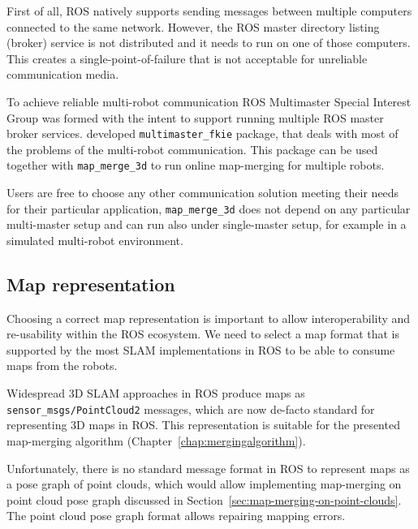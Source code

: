 First of all, \gls{ROS} natively supports sending messages between multiple computers connected to the same network. However, the \gls{ROS} master directory listing (broker) service is not distributed and it needs to run on one of those computers. This creates a single-point-of-failure that is not acceptable for unreliable communication media.

To achieve reliable multi-robot communication \gls{ROS} Multimaster Special Interest Group was formed with the intent to support running multiple \gls{ROS} master broker services. \citet{hernadez2015multi} developed \texttt{multimaster\_fkie} package, that deals with most of the problems of the multi-robot communication. This package can be used together with \texttt{map\_merge\_3d} to run online map-merging for multiple robots.

Users are free to choose any other communication solution meeting their needs for their particular application, \texttt{map\_merge\_3d} does not depend on any particular multi-master setup and can run also under single-master setup, for example in a simulated multi-robot environment.

\subsection{Map representation}
\label{sec:map-representation}

Choosing a correct map representation is important to allow interoperability and re-usability within the \gls{ROS} ecosystem. We need to select a map format that is supported by the most \gls{SLAM} implementations in \gls{ROS} to be able to consume maps from the robots.

Widespread \gls{3D} \gls{SLAM} approaches in \gls{ROS} produce maps as \texttt{sen\-sor\_msgs/\-Point\-Cloud2} messages, which are now de-facto standard for representing \gls{3D} maps in \gls{ROS}. This representation is suitable for the presented map-merging algorithm (Chapter~\ref{chap:mergingalgorithm}).

Unfortunately, there is no standard message format in \gls{ROS} to represent maps as a pose graph of point clouds, which would allow implementing map-merging on point cloud pose graph discussed in Section~\ref{sec:map-merging-on-point-clouds}. The point cloud pose graph format allows repairing mapping errors.

